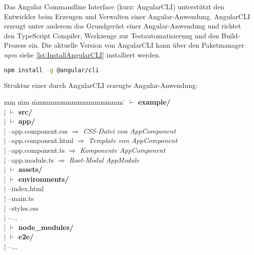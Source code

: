Das Angular Commandline Interface (kurz: AngularCLI) unterstützt den Entwickler beim Erzeugen und Verwalten einer Angular-Anwendung. AngularCLI erzeugt unter anderem  das Grundgerüst einer Angular-Anwendung und richtet den TypeScript Compiler, Werkzeuge zur Testautomatisierung und den Build-Prozess ein. Die aktuelle Version von AngularCLI kann über den Paketmanager \textit{npm} siehe \autoref{lst:InstallAngularCLI} installiert werden. \autocites[vgl.][1\psqq]{Steyer.2017}[vgl.][7\psqq]{Freeman.2018}[vgl.][6\psqq]{Woiwode.2018} 


\begin{lstlisting}[caption=Installation von AngularCLI, label=lst:InstallAngularCLI, language=bash]
npm install -g @angular/cli
\end{lstlisting}

Struktur einer durch AngularCLI erzeugte Angular-Anwendung:
\begin{tabbing}
	mm \= mm \= mmmmmmmmmmmmmmmm \= \kill
	$\vdash$ \textbf{example/} \\ 
	| \> $\vdash$ \textbf{src/}\\ 
	| \> \> $\vdash$  \textbf{app/}\\
	| \> \>  --app.component.css  $\Rightarrow$ \textit{CSS-Datei von AppComponent}\\ 
	| \> \>  --app.component.html  $\Rightarrow$ \textit{Template von AppComponent}\\
	| \> \>  --app.component.ts	 $\Rightarrow$ \textit{Komponente AppComponent}\\
	| \> \>  --app.module.ts  $\Rightarrow$ \textit{Root-Modul AppModule}\\
	| \> \> $\vdash$ \textbf{assets/} \\
	| \> \> $\vdash$ \textbf{environments/} \\
	| \> --index.html\\
	| \> --main.ts\\
	| \> --styles.css \\
	| \> --... \\
	| \> $\vdash$ \textbf{node\_modules/}\\ 
	| \> $\vdash$ \textbf{e2e/}\\   
	| --...\\
\end{tabbing}


